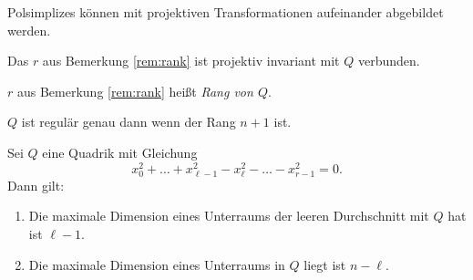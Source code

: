 \documentclass[11pt]{article}
\begin{document}
\begin{remark}
Polsimplizes können mit projektiven Transformationen aufeinander abgebildet werden.
\end{remark}
\begin{remark}
Das $r$ aus Bemerkung \ref{rem:rank} ist projektiv invariant mit $Q$ verbunden.
\end{remark}
\begin{definition}
$r$ aus Bemerkung \ref{rem:rank} heißt \textit{Rang von $Q$}.
\end{definition}
\begin{remark}
$Q$ ist regulär genau dann wenn der Rang $n+1$ ist.
\end{remark}
\begin{theorem}
Sei $Q$ eine Quadrik mit Gleichung \begin{equation}\label{eq:dimquad}
    x_0^2 + \dots + x_{\ell-1}^2 - x_\ell^2 - \dots  - x_{r-1}^2 = 0.
\end{equation}
Dann gilt: \begin{enumerate}
    \item Die maximale Dimension eines Unterraums der leeren Durchschnitt mit $Q$ hat ist $\ell-1$.
    \item  Die maximale Dimension eines Unterraums in $Q$ liegt ist $n-\ell$.
\end{enumerate}
\end{theorem}
\end{document}
